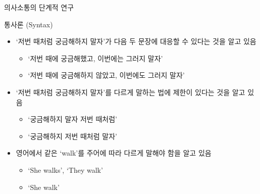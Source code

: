 \documentclass[11pt, aspectratio=169]{beamer}
\begin{document}
\begin{frame}[t]{의사소통의 단계적 연구}
  \begin{block}{통사론 (Syntax)}
    \begin{itemize}
      \item ‘저번 때처럼 궁금해하지 말자’가 다음 두 문장에 대응할 수 있다는 것을 알고 있음
        \begin{itemize}
          \item ‘저번 때에 궁금해했고, 이번에는 그러지 말자’
          \item ‘저번 때에 궁금해하지 않았고, 이번에도 그러지 말자’
        \end{itemize}
        \vfill
      \item ‘저번 때처럼 궁금해하지 말자’를 다르게 말하는 법에 제한이 있다는 것을 알고 있음
        \begin{itemize}
          \item[\checkmark]‘궁금해하지 말자 저번 때처럼’
          \item[\texttimes] ‘궁금해하지 저번 때처럼 말자’
        \end{itemize}
        \vfill
      \item 영어에서 같은 ‘walk’를 주어에 따라 다르게 말해야 함을 알고 있음
        \begin{itemize}
          \item[\checkmark] ‘She walks’, ‘They walk’
          \item[\texttimes] ‘She walk’
        \end{itemize}
    \end{itemize}
  \end{block}
\end{frame}
\end{document}
